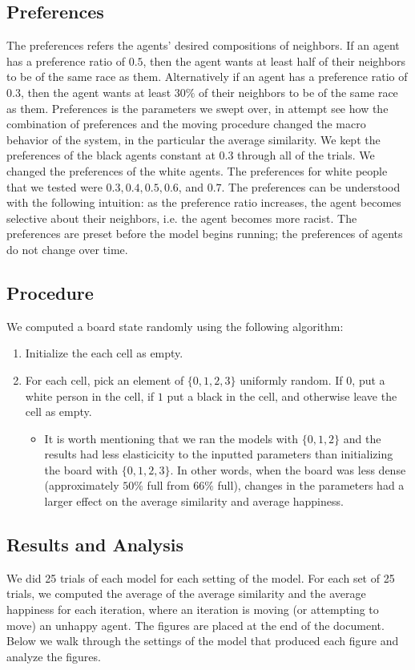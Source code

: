 \documentclass[11pt,twoside]{amsart}
\theoremstyle{theorem}
\theoremstyle{definition}
\theoremstyle{remark}
\begin{document}
\subsection{Preferences}
The preferences refers the agents' desired compositions of neighbors.
If an agent has a preference ratio of $0.5$, then the agent wants at least half of their neighbors to be of the same race as them.
Alternatively if an agent has a preference ratio of $0.3$, then the agent wants at least $30\%$ of their neighbors to be of the same race as them.
Preferences is the parameters we swept over, in attempt see how the combination of preferences and the moving procedure changed the macro behavior of the system, in the particular the average similarity.
We kept the preferences of the black agents constant at $0.3$ through all of the trials.
We changed the preferences of the white agents. 
The preferences for white people that we tested were $0.3, 0.4, 0.5, 0.6$, and $0.7$. 
The preferences can be understood with the following intuition: as the preference ratio increases, the agent becomes selective about their neighbors, i.e. the agent becomes more racist. 
The preferences are preset before the model begins running; the preferences of agents do not change over time. 

\subsection{Procedure}
We computed a board state randomly using the following algorithm: 
\begin{enumerate}
    \item Initialize the each cell as empty.
    \item For each cell, pick an element of $\{0,1,2,3\}$ uniformly random. If $0$, put a white person in the cell, if $1$ put a black in the cell, and otherwise leave the cell as empty.
        \begin{itemize}
            \item It is worth mentioning that we ran the models with $\{0,1,2\}$ and the results had less elasticicity to the inputted parameters than initializing the board with $\{0,1,2,3\}$. In other words, when the board was less dense (approximately $50\%$ full from $66\%$ full), changes in the parameters had a larger effect on the average similarity and average happiness. 
        \end{itemize}
\end{enumerate}

\subsection{Results and Analysis}
We did 25 trials of each model for each setting of the model.
For each set of 25 trials, we computed the average of the average similarity and the average happiness for each iteration, where an iteration is moving (or attempting to move) an unhappy agent.
The figures are placed at the end of the document. 
Below we walk through the settings of the model that produced each figure and analyze the figures.
\end{document}

